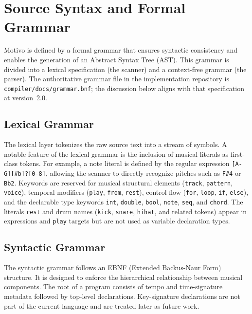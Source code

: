 \section{Source Syntax and Formal Grammar}\label{sec:source-grammar}

Motivo is defined by a formal grammar that ensures syntactic consistency and enables the generation of an
Abstract Syntax Tree (AST).
This grammar is divided into a lexical specification (the scanner) and a context-free grammar (the parser).
The authoritative grammar file in the implementation repository is \texttt{compiler/docs/grammar.bnf}; the
discussion below aligns with that specification at version~2.0.

\subsection{Lexical Grammar}\label{detail-subsec:lexical-grammar}

The lexical layer tokenizes the raw source text into a stream of symbols.
A notable feature of the lexical grammar is the inclusion of musical literals as first-class tokens.
For example, a note literal is defined by the regular expression \verb|[A-G][#b]?[0-8]|, allowing the scanner to
directly recognize pitches such as \texttt{F\#4} or \texttt{Bb2}.
Keywords are reserved for musical structural elements (\texttt{track}, \texttt{pattern}, \texttt{voice}),
temporal modifiers (\texttt{play}, \texttt{from}, \texttt{rest}), control flow (\texttt{for}, \texttt{loop},
\texttt{if}, \texttt{else}), and the declarable type keywords \texttt{int}, \texttt{double}, \texttt{bool},
\texttt{note}, \texttt{seq}, and \texttt{chord}.
The literals \texttt{rest} and drum names (\texttt{kick}, \texttt{snare}, \texttt{hihat}, and related tokens) appear
in expressions and \texttt{play} targets but are not used as variable declaration types.

\subsection{Syntactic Grammar}\label{detail-subsec:syntactic-grammar}

The syntactic grammar follows an EBNF (Extended Backus-Naur Form) structure.
It is designed to enforce the hierarchical relationship between musical components.
The root of a program consists of tempo and time-signature metadata followed by top-level declarations.
Key-signature declarations are not part of the current language and are treated later as future work.

